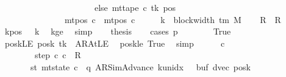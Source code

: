 \begin{isabellebody}
\ \ \ \ \ \ \ \ \ \ \ \ \ \ \ \ \ \ \ \ \ \ else\ mt{\isacharunderscore}{\kern0pt}tape\ c{\isacharprime}{\kern0pt}\ tk\ pos{\isacharparenright}{\kern0pt}{\isacharparenright}{\kern0pt}{\isacharparenright}{\kern0pt}\isanewline
\ \ \ \ \ \ \ \ \ \ \ \ \ \ {\isasymand}\ mt{\isacharunderscore}{\kern0pt}pos\ c{\isacharprime}{\kern0pt}{\isacharprime}{\kern0pt}\ {\isacharequal}{\kern0pt}\ mt{\isacharunderscore}{\kern0pt}pos\ c{\isacharprime}{\kern0pt}{\isachardoublequoteclose}\isanewline
%
\isadelimproof
%
\endisadelimproof
%
\isatagproof
{}\isamarkupfalse%
\ {\isacharminus}{\kern0pt}\isanewline
\ \ \isamarkupfalse%
\ {\isacharquery}{\kern0pt}k\ {\isacharequal}{\kern0pt}\ {\isachardoublequoteopen}block{\isacharunderscore}{\kern0pt}width\ {\isacharparenleft}{\kern0pt}{\isasymGamma}{\isacharunderscore}{\kern0pt}tm\ M{\isacharparenright}{\kern0pt}{\isachardoublequoteclose}\isanewline
\ \ \isamarkupfalse%
\ {\isacharquery}{\kern0pt}R\ {\isacharequal}{\kern0pt}\ R{\isacharprime}{\kern0pt}\isanewline
\ \ \isamarkupfalse%
\ kpos{\isacharcolon}{\kern0pt}\ {\isachardoublequoteopen}{}\ {\isacharless}{\kern0pt}\ {\isacharquery}{\kern0pt}k{\isachardoublequoteclose}\ \isamarkupfalse%
\ kge{}\ \isamarkupfalse%
\ simp\isanewline
\ \ \isamarkupfalse%
\ {\isacharquery}{\kern0pt}thesis\isanewline
\ \ \isamarkupfalse%
\ {\isacharparenleft}{\kern0pt}cases\ {\isachardoublequoteopen}p\ {\isacharequal}{\kern0pt}\ {}{\isachardoublequoteclose}{\isacharparenright}{\kern0pt}\isanewline
\ \ \ \ \isamarkupfalse%
\ True\isanewline
\ \ \ \ \isamarkupfalse%
\ poskLE{\isacharcolon}{\kern0pt}\ {\isachardoublequoteopen}posk\ tk\ {\isacharequal}{\kern0pt}\ AR{\isacharunderscore}{\kern0pt}AtLE{\isachardoublequoteclose}\ \isamarkupfalse%
\ poskle\ True\ \isamarkupfalse%
\ simp\isanewline
\ \ \ \ \isamarkupfalse%
\ c{\isacharprime}{\kern0pt}{\isacharprime}{\kern0pt}\ \isanewline
\ \ \ \ \ \ \ \ step{\isacharcolon}{\kern0pt}\ {\isachardoublequoteopen}{\isacharparenleft}{\kern0pt}c{\isacharprime}{\kern0pt}{\isacharcomma}{\kern0pt}\ c{\isacharprime}{\kern0pt}{\isacharprime}{\kern0pt}{\isacharparenright}{\kern0pt}\ {\isasymin}\ {\isacharquery}{\kern0pt}R{\isachardoublequoteclose}\isanewline
\ \ \ \ \ \ \ st{\isacharcolon}{\kern0pt}\ {\isachardoublequoteopen}mt{\isacharunderscore}{\kern0pt}state\ c{\isacharprime}{\kern0pt}{\isacharprime}{\kern0pt}\ {\isacharequal}{\kern0pt}\ {\isacharparenleft}{\kern0pt}q{\isacharcomma}{\kern0pt}\ AR{\isacharunderscore}{\kern0pt}SimAdvance{\isacharcomma}{\kern0pt}\ k{\isacharunderscore}{\kern0pt}unidx\ {}{\isacharcomma}{\kern0pt}\ {}{\isacharcomma}{\kern0pt}\ buf{\isacharcomma}{\kern0pt}\ dvec{\isacharcomma}{\kern0pt}\ posk{\isacharparenright}{\kern0pt}{\isachardoublequoteclose}\isanewline

\end{isabellebody}
